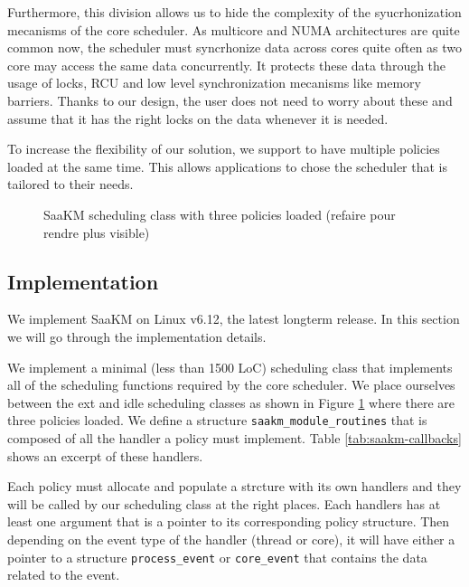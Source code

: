\par Furthermore, this division allows us to hide the complexity of the syucrhonization mecanisms of the core scheduler. As multicore and NUMA architectures are quite common now, the scheduler must syncrhonize data across cores quite often as two core may access the same data concurrently. It protects these data through the usage of locks, RCU and low level synchronization mecanisms like memory barriers. Thanks to our design, the user does not need to worry about these and assume that it has the right locks on the data whenever it is needed. \newline

\par To increase the flexibility of our solution, we support to have multiple policies loaded at the same time. This allows applications to chose the scheduler that is tailored to their needs.

\begin{figure}[htbp]
        \centering
        
        \caption{SaaKM scheduling class with three policies loaded (refaire pour rendre plus visible)}
        \label{fig:linux-saakm-sched-class}
\end{figure}

\subsection{Implementation}
\par We implement SaaKM on Linux v6.12, the latest longterm release. In this section we will go through the implementation details.

\par We implement a minimal (less than 1500 LoC) scheduling class that implements all of the scheduling functions required by the core scheduler. We place ourselves between the ext and idle scheduling classes as shown in Figure \ref{fig:linux-saakm-sched-class} where there are three policies loaded. We define a structure \texttt{saakm\_module\_routines} that is composed of all the handler a policy must implement. Table \ref{tab:saakm-callbacks} shows an excerpt of these handlers.

\par Each policy must allocate and populate a strcture with its own handlers and they will be called by our scheduling class at the right places. Each handlers has at least one argument that is a pointer to its corresponding policy structure. Then depending on the event type of the handler (thread or core), it will have either a pointer to a structure \texttt{process\_event} or \texttt{core\_event} that contains the data related to the event.\newline

